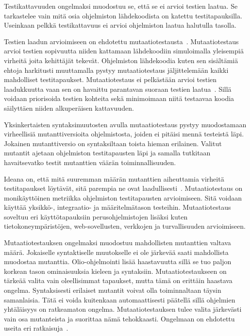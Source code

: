 \documentclass[finnish]{../tktltiki2}
\theoremstyle{definition}
\theoremstyle{remark}
\begin{document}
Testikattavuuden ongelmaksi muodostuu se, että se ei arvioi testien laatua. Se tarkastelee vain mitä osia ohjelmiston 
lähdekoodista on katettu testitapauksilla. Useinkaan pelkkä testikattavuus ei arvioi ohjelmiston laatua halutulla 
tasolla.

    Testien laadun arvioimiseen on ehdotettu mutaatiotestausta~\cite{YH11}. Mutaatiotestaus arvioi testien sopivuutta 
niiden kattamaan lähdekoodiin simuloimalla yleisempiä virheitä joita kehittäjät tekevät. Ohjelmiston lähdekoodia kuten 
sen sisältämiä ehtoja harkitusti muuttamalla pystyy mutaatiotestaus jäljittelemään kaikki mahdolliset testitapaukset. 
Mutaatiotestaus ei pelkästään arvioi testien laadukkuutta vaan sen on havaittu parantavan suoraan testien 
laatua~\cite{YH11}. Sillä voidaan priorisoida testien kohteita sekä minimoimaan niitä testaavaa koodia säilyttäen niiden 
alkuperäisen kattavuuden.

    Yksinkertaisten syntaksimuutosten avulla mutaatiotestaus pystyy muodostamaan virheellisiä mutanttiversioita 
ohjelmistosta, joiden ei pitäisi mennä testeistä läpi. Jokainen mutanttiversio on syntaksiltaan toista hieman erilainen. 
Valitut mutantit ajetaan ohjelmiston testitapausten läpi ja samalla tutkitaan havaitsevatko testit mutanttien väärän 
toiminnallisuuden.

    Ideana on, että mitä suuremman määrän mutanttien aiheuttamia virheitä testitapaukset löytävät, sitä parempia ne ovat 
laadullisesti~\cite{YH11}. Mutaatiotestaus on monikäyttöinen metriikka ohjelmiston testitapausten arvioimiseen. Sitä 
voidaan käyttää yksikkö-, integraatio- ja määritelmätason testeihin. Mutaatiotestaus soveltuu eri käyttötapauksiin 
perusohjelmistojen lisäksi kuten tietokoneympäristöjen, web-sovellusten, verkkojen ja turvallisuuden arvioimiseen.

    Mutaatiotestauksen ongelmaksi muodostuu mahdollisten mutanttien valtava määrä. Jokaiselle syntaktiselle muutokselle 
ei ole järkevää saati mahdollista muodostaa mutanttia. Olio-ohjelmointi lisää haastavuutta sillä se tuo paljon korkean 
tason ominaisuuksia kieleen ja syntaksiin. Mutaatiotestaukseen on tärkeää valita vain oleellisimmat tapaukset, mutta 
tämä on erittäin haastava ongelma. Syntaksisesti erilaiset mutantit voivat olla toiminnaltaan täysin samanlaisia. Tätä 
ei voida kuitenkaan automaattisesti päätellä sillä ohjelmien yhtäläisyys on ratkeamaton ongelma. Mutaatiotestauksen 
tulee valita järkevästi vain osa mutanteista ja suorittaa nämä tehokkaasti. Ongelmaan on ehdotettu useita eri 
ratkaisuja~\cite{YH11}.
\end{document}
